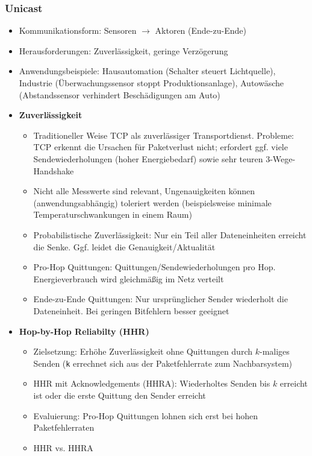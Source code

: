 \subsubsection{Unicast}
\begin{itemize}
	\item Kommunikationsform: Sensoren \(\rightarrow\) Aktoren (Ende-zu-Ende)
	\item Herausforderungen: Zuverlässigkeit, geringe Verzögerung
	\item Anwendungsbeispiele: Hausautomation (Schalter steuert Lichtquelle), Industrie (Überwachungssensor stoppt Produktionsanlage), Autowäsche (Abstandssensor verhindert Beschädigungen am Auto)
	\item \textbf{Zuverlässigkeit}
	\begin{itemize}
		\item Traditioneller Weise TCP als zuverlässiger Transportdienst. Probleme: TCP erkennt die Ursachen für Paketverlust nicht; erfordert ggf. viele Sendewiederholungen (hoher Energiebedarf) sowie sehr teuren 3-Wege-Handshake
		\item Nicht alle Messwerte sind relevant, Ungenauigkeiten können (anwendungsabhängig) toleriert werden (beispielsweise minimale Temperaturschwankungen in einem Raum)
		\item Probabilistische Zuverlässigkeit: Nur ein Teil aller Dateneinheiten erreicht die Senke. Ggf. leidet die Genauigkeit/Aktualität
		\item Pro-Hop Quittungen: Quittungen/Sendewiederholungen pro Hop. Energieverbrauch wird gleichmäßig im Netz verteilt
		\item Ende-zu-Ende Quittungen: Nur ursprünglicher Sender wiederholt die Dateneinheit. Bei geringen Bitfehlern besser geeignet
	\end{itemize}
	\item \textbf{Hop-by-Hop Reliabilty (HHR)}
	\begin{itemize}
		\item Zielsetzung: Erhöhe Zuverlässigkeit ohne Quittungen durch \(k\)-maliges Senden (\texttt{k} errechnet sich aus der Paketfehlerrate zum Nachbarsystem)
		\item HHR mit Acknowledgements (HHRA): Wiederholtes Senden bis \(k\) erreicht ist oder die erste Quittung den Sender erreicht
		\item Evaluierung: Pro-Hop Quittungen lohnen sich erst bei hohen Paketfehlerraten
		\item HHR vs. HHRA
		\begin{itemize}

\end{itemize}
\end{itemize}
\end{itemize}
